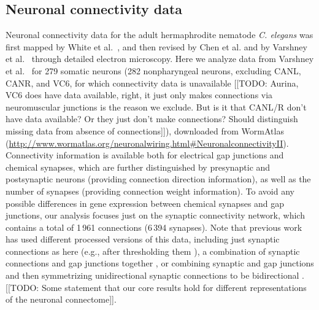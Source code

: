 \documentclass[10pt,letterpaper]{article}
\begin{document}


\subsection*{Neuronal connectivity data}
Neuronal connectivity data for the adult hermaphrodite nematode \emph{C. elegans} was first mapped by White et al.~\cite{White:1986tx}, and then revised by Chen et al. \cite{Chen:2006ie} and by Varshney et al.~\cite{Varshney2011} through detailed electron microscopy.
Here we analyze data from Varshney et al.~\cite{Varshney2011} for 279 somatic neurons (282 nonpharyngeal neurons, excluding CANL, CANR, and VC6, for which connectivity data is unavailable [[TODO: Aurina, VC6 does have data available, right, it just only makes connections via neuromuscular junctions is the reason we exclude. But is it that CANL/R don't have data available? Or they just don't make connections? Should distinguish missing data from absence of connections]]), downloaded from WormAtlas (\url{http://www.wormatlas.org/neuronalwiring.html#NeuronalconnectivityII}).
Connectivity information is available both for electrical gap junctions and chemical synapses, which are further distinguished by presynaptic and postsynaptic neurons (providing connection direction information), as well as the number of synapses (providing connection weight information).
To avoid any possible differences in gene expression between chemical synapses and gap junctions, our analysis focuses just on the synaptic connectivity network, which contains a total of 1\,961 connections (6\,394 synapses).
Note that previous work has used different processed versions of this data, including just synaptic connections as here (e.g., after thresholding them \cite{Kashtan:2004ev}), a combination of synaptic connections and gap junctions together \cite{Azulay:2016cg, Kim:2016gl}, or combining synaptic and gap junctions and then symmetrizing unidirectional synaptic connections to be bidirectional \cite{Towlson:2013gf, Kim:2014bu, Pavlovic:2014gx}.
[[TODO: Some statement that our core results hold for different representations of the neuronal connectome]].
\end{document}
